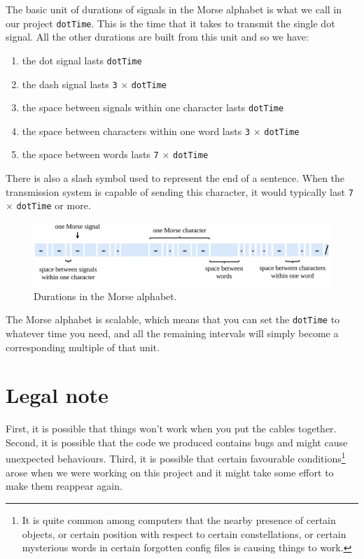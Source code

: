 \documentclass[12pt]{report}
\begin{document}
The basic unit of durations of signals in the Morse alphabet is what we call in our project \verb|dotTime|. This is the time that it takes to transmit the single dot signal. All the other durations are built from this unit and so we have:

\begin{enumerate}
\item the dot signal lasts \verb|dotTime|

\item the dash signal lasts \verb|3| $\times$ \verb|dotTime|

\item the space between signals within one character lasts \verb|dotTime|

\item the space between characters within one word lasts \verb|3| $\times$ \verb|dotTime|

\item the space between words lasts \verb|7| $\times$ \verb|dotTime|

\end{enumerate}

There is also a slash symbol used to represent the end of a sentence. When the transmission system is capable of sending this character, it would typically last \verb|7| $\times$ \verb|dotTime| or more.

\begin{figure}[H]
\centering\includegraphics[width=14.5cm]{morse_durations}
\caption{Durations in the Morse alphabet.}			
\label{fig:morse_durations}
\end{figure}

The Morse alphabet is scalable, which means that you can set the \verb|dotTime| to whatever time you need, and all the remaining intervals will simply become a corresponding multiple of that unit.

\section{Legal note}

First, it is possible that things won't work when you put the cables together. Second, it is possible that the code we produced contains bugs and might cause unexpected behaviours. Third, it is possible that certain favourable conditions\footnote{It is quite common among computers that the nearby presence of certain objects, or certain position with respect to certain constellations, or certain mysterious words in certain forgotten config files is causing things to work.} arose when we were working on this project and it might take some effort to make them reappear again.
\end{document}
